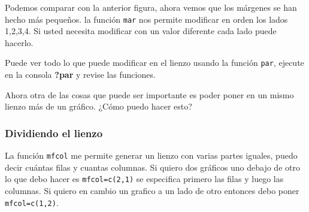 \documentclass[]{article}
\begin{document}
Podemos comparar con la anterior figura, ahora vemos que los márgenes se
han hecho más pequeños. la función \texttt{mar} nos permite modificar en
orden los lados 1,2,3,4. Si usted necesita modificar con un valor
diferente cada lado puede hacerlo.

Puede ver todo lo que puede modificar en el lienzo usando la función
\texttt{par}, ejecute en la consola \textbf{?par} y revise las
funciones.

Ahora otra de las cosas que puede ser importante es poder poner en un
mismo lienzo más de un gráfico. ¿Cómo puedo hacer esto?

\subsubsection{Dividiendo el lienzo}\label{dividiendo-el-lienzo}

La función \texttt{mfcol} me permite generar un lienzo con varias partes
iguales, puedo decir cuántas filas y cuantas columnas. Si quiero dos
gráficos uno debajo de otro lo que debo hacer es \texttt{mfcol=c(2,1)}
se especifica primero las filas y luego las columnas. Si quiero en
cambio un grafico a un lado de otro entonces debo poner
\texttt{mfcol=c(1,2)}.
\end{document}
